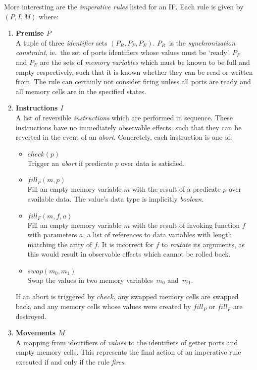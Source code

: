 More interesting are the \textit{imperative rules} listed for an IF. Each rule is given by $(P,I,M)$ where:
\begin{enumerate}
	\item \textbf{Premise $P$}\\
	A tuple of three \textit{identifier} sets $(P_R, P_F, P_E)$. $P_R$~is the \textit{synchronization constraint}, ie.\ the set of ports identifiers whose values must be `ready'. $P_F$ and $P_E$ are the sets of \textit{memory variables} which must be known to be full and empty respectively, such that it is known whether they can be read or written from. The rule can certainly not consider firing unless all ports are ready and all memory cells are in the specified states.
	
	\item \textbf{Instructions $I$}\\
	A list of reversible \textit{instructions} which are performed in sequence. These instructions have no immediately observable effects, such that they can be reverted in the event of an \textit{abort}. Concretely, each instruction is one of:
	\begin{itemize}
		\item $check(p)$\\
		Trigger an \textit{abort} if predicate $p$ over data is satisfied.
		\item $fill_P(m, p)$\\Fill an empty memory variable $m$ with the result of a predicate $p$ over available data. The value's data type is implicitly \textit{boolean}.
		\item $fill_F(m, f, a)$\\
		Fill an empty memory variable $m$ with the result of invoking function $f$ with parameters $a$, a list of references to data variables with length matching the arity of $f$. It is incorrect for $f$ to \textit{mutate} its arguments, as this would result in observable effects which cannot be rolled back.
		\item $swap(m_0,m_1)$\\
		Swap the values in two memory variables~$m_0$ and~$m_1$.
	\end{itemize}
	If an abort is triggered by $check$, any swapped memory cells are swapped back, and any memory cells whose values were created by $fill_P$ or $fill_F$ are destroyed.
	
	\item \textbf{Movements $M$}\\
	A mapping from identifiers of \textit{values} to the identifiers of getter ports and empty memory cells. This represents the final action of an imperative rule executed if and only if the rule \textit{fires}.
\end{enumerate}

